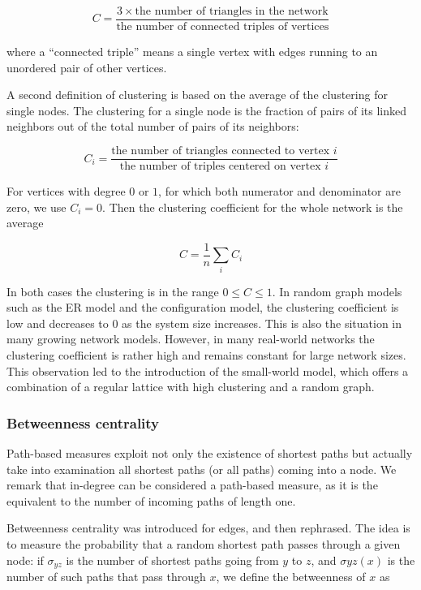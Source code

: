 \documentclass[12pt]{article}
\newcommand{\s}{\vspace*{0.4cm}}
\newcommand{\nd}{\noindent}
\begin{document}
\begin{equation}
    C = \frac{3 \times \text{the number of triangles in the network}}{\text{the number of connected triples of vertices}}
\end{equation}

\nd where a “connected triple” means a single vertex with edges running to an unordered
pair of other vertices.

A second definition of clustering is based on the average of the clustering for single
nodes. The clustering for a single node is the fraction of pairs of its linked neighbors
out of the total number of pairs of its neighbors:

\begin{equation}
    C_i = \frac{\text{the number of triangles connected to vertex }i}{\text{the number of triples centered on vertex } i}
\end{equation}

\nd For vertices with degree $0$ or $1$, for which both numerator and denominator are zero, we use $C_i = 0$. Then the clustering coefficient for the whole network is the average

\begin{equation}
    C = \frac{1}{n} \sum_{i} C_i
\end{equation}

\nd In both cases the clustering is in the range $0 \leq C \leq 1$. In random graph models such as the ER model and the configuration model, the clustering coefficient is low and decreases to $0$ as the system size increases. This is also the situation in many growing network models. However, in many real-world networks the clustering coefficient is rather high and remains constant for large network sizes. This observation led to the introduction of the small-world model, which offers a combination of a regular lattice with high clustering and a random graph.

\subsubsection{Betweenness centrality}

Path-based measures exploit not only the existence of shortest paths but actually take into examination all shortest paths (or all paths) coming into a node. We remark that in-degree can be considered a path-based measure, as it is the equivalent to the number of incoming paths of length one. \s

\nd Betweenness centrality  was introduced for edges, and then rephrased. The idea is to measure the probability that a random shortest path passes through a given node: if $\sigma_{yz}$ is the number of shortest paths going from $y$ to $z$, and $\sigma{yz}(x)$ is the number of such paths that pass through $x$, we define the betweenness of $x$ as
\end{document}
